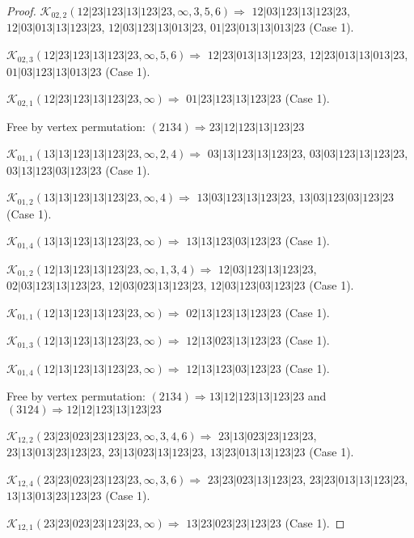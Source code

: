 \documentclass[12pt]{article}
\theoremstyle{plain}
\theoremstyle{definition}
\theoremstyle{remark}
\newcommand{\fancy}[1]{\mathcal{#1}}
\def\K{\fancy{K}}
\begin{document}
\begin{proof}
	
	\bigskip
	
	$\K_{02,2}(12|23|123|13|123|23,\infty,3, 5, 6)\Rightarrow $ $12|03|123|13|123|23$, $12|03|013|13|123|23$, $12|03|123|13|013|23$, $01|23|013|13|013|23$ (Case 1).
	
	$\K_{02,3}(12|23|123|13|123|23,\infty,5, 6)\Rightarrow $ $12|23|013|13|123|23$, $12|23|013|13|013|23$, $01|03|123|13|013|23$ (Case 1).
	
	$\K_{02,1}(12|23|123|13|123|23,\infty)\Rightarrow $ $01|23|123|13|123|23$ (Case 1).
	
	
	
	Free by vertex permutation: $(2 1 3 4)\Rightarrow 23|12|123|13|123|23$
	
	
	
	\bigskip
	
	$\K_{01,1}(13|13|123|13|123|23,\infty,2, 4)\Rightarrow $ $03|13|123|13|123|23$, $03|03|123|13|123|23$, $03|13|123|03|123|23$ (Case 1).
	
	$\K_{01,2}(13|13|123|13|123|23,\infty,4)\Rightarrow $ $13|03|123|13|123|23$, $13|03|123|03|123|23$ (Case 1).
	
	$\K_{01,4}(13|13|123|13|123|23,\infty)\Rightarrow $ $13|13|123|03|123|23$ (Case 1).
	
	
	\bigskip
	
	$\K_{01,2}(12|13|123|13|123|23,\infty,1, 3, 4)\Rightarrow $ $12|03|123|13|123|23$, $02|03|123|13|123|23$, $12|03|023|13|123|23$, $12|03|123|03|123|23$ (Case 1).
	
	$\K_{01,1}(12|13|123|13|123|23,\infty)\Rightarrow $ $02|13|123|13|123|23$ (Case 1).
	
	$\K_{01,3}(12|13|123|13|123|23,\infty)\Rightarrow $ $12|13|023|13|123|23$ (Case 1).
	
	$\K_{01,4}(12|13|123|13|123|23,\infty)\Rightarrow $ $12|13|123|03|123|23$ (Case 1).
	
	
	
	Free by vertex permutation: $(2 1 3 4)\Rightarrow 13|12|123|13|123|23$ and $(3 1 2 4)\Rightarrow 12|12|123|13|123|23$
	
	
	
	\bigskip
	
	$\K_{12,2}(23|23|023|23|123|23,\infty,3, 4, 6)\Rightarrow $ $23|13|023|23|123|23$, $23|13|013|23|123|23$, $23|13|023|13|123|23$, $13|23|013|13|123|23$ (Case 1).
	
	$\K_{12,4}(23|23|023|23|123|23,\infty,3, 6)\Rightarrow $ $23|23|023|13|123|23$, $23|23|013|13|123|23$, $13|13|013|23|123|23$ (Case 1).
	
	$\K_{12,1}(23|23|023|23|123|23,\infty)\Rightarrow $ $13|23|023|23|123|23$ (Case 1).
	

\end{proof}
\end{document}
